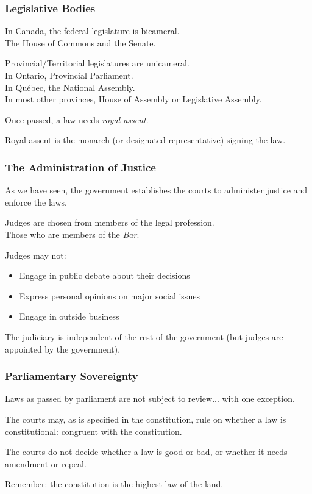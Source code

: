 \begin{frame}
\frametitle{Legislative Bodies}

In Canada, the federal legislature is bicameral.\\
\quad The House of Commons and the Senate.

Provincial/Territorial legislatures are unicameral.\\
\quad In Ontario, Provincial Parliament.\\
\quad In Qu\'ebec, the National Assembly.\\
\quad In most other provinces, House of Assembly or Legislative Assembly.

Once passed, a law needs \textit{royal assent}.

Royal assent is the monarch (or designated representative) signing the law.

\end{frame}


\begin{frame}
\frametitle{The Administration of Justice}

As we have seen, the government establishes the courts to administer justice and enforce the laws.

Judges are chosen from members of the legal profession.\\
\quad Those who are members of the \textit{Bar}.

Judges may not:
\begin{itemize}
	\item Engage in public debate about their decisions
	\item Express personal opinions on major social issues
	\item Engage in outside business
\end{itemize}

The judiciary is independent of the rest of the government (but judges are appointed by the government).

\end{frame}



\begin{frame}
\frametitle{Parliamentary Sovereignty}

Laws as passed by parliament are not subject to review... with one exception.

The courts may, as is specified in the constitution, rule on whether a law is constitutional: congruent with the constitution.

The courts do not decide whether a law is good or bad, or whether it needs amendment or repeal.

Remember: the constitution is the highest law of the land.

\end{frame}



